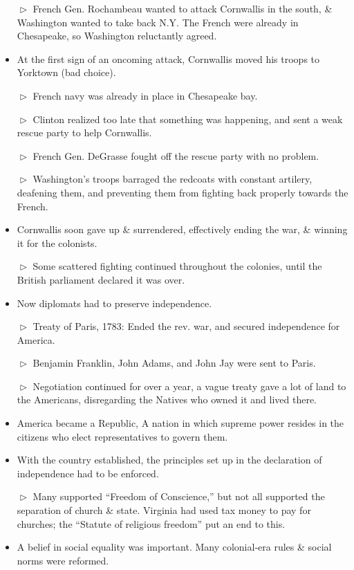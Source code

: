 \documentclass[10pt]{article}
\begin{document}
\begin{flushleft}
\begin{multicols}{2}
\begin{itemize}
\item[$\vartriangleright$] French Gen. Rochambeau wanted to attack Cornwallis in the south, \& Washington wanted to take back N.Y. The French were already in Chesapeake, so Washington reluctantly agreed.
\item At the first sign of an oncoming attack, Cornwallis moved his troops to Yorktown (bad choice).
\item[$\vartriangleright$] French navy was already in place in Chesapeake bay.
\item[$\vartriangleright$] Clinton realized too late that something was happening, and sent a weak rescue party to help Cornwallis.
\item[$\vartriangleright$] French Gen. DeGrasse fought off the rescue party with no problem.
\item[$\vartriangleright$] Washington's troops barraged the redcoats with constant artilery, deafening them, and preventing them from fighting back properly towards the French.
\item Cornwallis soon gave up \& surrendered, effectively ending the war, \& winning it for the colonists.
\item[$\vartriangleright$] Some scattered fighting continued throughout the colonies, until the British parliament declared it was over.
\item Now diplomats had to preserve independence.
\item[$\vartriangleright$] Treaty of Paris, 1783: Ended the rev. war, and secured independence for America.
\item[$\vartriangleright$] Benjamin Franklin, John Adams, and John Jay were sent to Paris.
\item[$\vartriangleright$] Negotiation continued for over a year, a vague treaty gave a lot of land to the Americans, disregarding the Natives who owned it and lived there.
\item America became a Republic, A nation in which supreme power resides in the citizens who elect representatives to govern them.
\item With the country established, the principles set up in the declaration of independence had to be enforced.
\item[$\vartriangleright$] Many supported ``Freedom of Conscience,'' but not all supported the separation of church \& state. Virginia had used tax money to pay for churches; the ``Statute of religious freedom'' put an end to this.
\item A belief in social equality was important. Many colonial-era rules \& social norms were reformed.

\end{itemize}
\end{multicols}
\end{flushleft}
\end{document}
